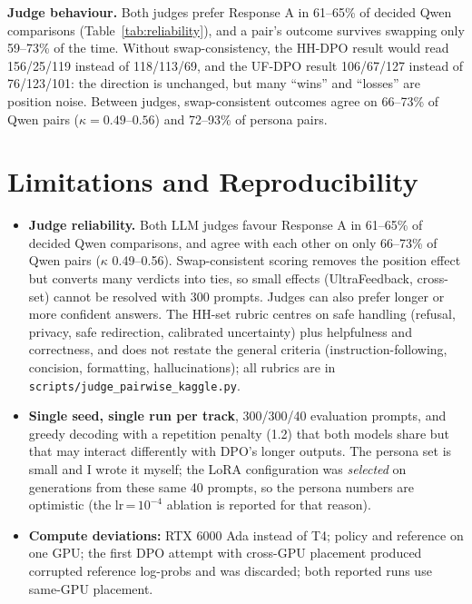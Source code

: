\documentclass[10pt]{article}
\begin{document}
\textbf{Judge behaviour.} Both judges prefer Response A in 61--65\% of decided Qwen comparisons (Table~\ref{tab:reliability}), and a pair's outcome survives swapping only 59--73\% of the time. Without swap-consistency, the HH-DPO result would read 156/25/119 instead of 118/113/69, and the UF-DPO result 106/67/127 instead of 76/123/101: the direction is unchanged, but many ``wins'' and ``losses'' are position noise. Between judges, swap-consistent outcomes agree on 66--73\% of Qwen pairs ($\kappa=0.49$--$0.56$) and 72--93\% of persona pairs.

\section{Limitations and Reproducibility}
\begin{itemize}
\item \textbf{Judge reliability.} Both LLM judges favour Response A in 61--65\% of decided Qwen comparisons, and agree with each other on only 66--73\% of Qwen pairs ($\kappa$ 0.49--0.56). Swap-consistent scoring removes the position effect but converts many verdicts into ties, so small effects (UltraFeedback, cross-set) cannot be resolved with 300 prompts. Judges can also prefer longer or more confident answers. The HH-set rubric centres on safe handling (refusal, privacy, safe redirection, calibrated uncertainty) plus helpfulness and correctness, and does not restate the general criteria (instruction-following, concision, formatting, hallucinations); all rubrics are in \texttt{scripts/judge\_pairwise\_kaggle.py}.
\item \textbf{Single seed, single run per track}, 300/300/40 evaluation prompts, and greedy decoding with a repetition penalty (1.2) that both models share but that may interact differently with DPO's longer outputs. The persona set is small and I wrote it myself; the LoRA configuration was \emph{selected} on generations from these same 40 prompts, so the persona numbers are optimistic (the lr\,=\,$10^{-4}$ ablation is reported for that reason).
\item \textbf{Compute deviations:} RTX 6000 Ada instead of T4; policy and reference on one GPU; the first DPO attempt with cross-GPU placement produced corrupted reference log-probs and was discarded; both reported runs use same-GPU placement.
\end{itemize}
\end{document}
